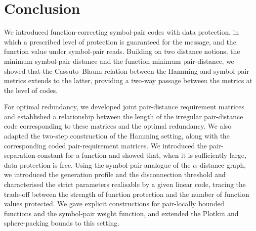 \documentclass[11pt,draftclsnofoot,journal,onecolumn]{IEEEtran}
\newtheorem{remark}{Remark}
\begin{document}
\section{Conclusion}\label{sec:conclusion}

    We introduced function-correcting symbol-pair codes with data protection, in which a prescribed level of protection is guaranteed for the message, and the function value under symbol-pair reads. Building on two distance notions, the minimum symbol-pair distance and the function minimum pair-distance, we showed that the Cassuto--Blaum relation between the Hamming and symbol-pair metrics extends to the latter, providing a two-way passage between the metrics at the level of codes.

    For optimal redundancy, we developed joint pair-distance requirement matrices and established a relationship between the length of the irregular pair-distance code corresponding to these matrices and the optimal redundancy. We also adapted the two-step construction of the Hamming setting, along with the corresponding coded pair-requirement matrices. We introduced the pair-separation constant for a function and showed that, when it is sufficiently large, data protection is free. Using the symbol-pair analogue of the $\alpha$-distance graph, we introduced the generation profile and the disconnection threshold and characterised the strict parameters realisable by a given linear code, tracing the trade-off between the strength of function protection and the number of function values protected. We gave explicit constructions for pair-locally bounded functions and the symbol-pair weight function, and extended the Plotkin and sphere-packing bounds to this setting.

\end{document}
